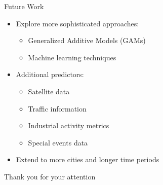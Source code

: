 \documentclass[svgnames, 10pt]{beamer}
\begin{document}
\begin{frame}{Future Work}
\begin{itemize}
    \item Explore more sophisticated approaches:
        \begin{itemize}
            \item Generalized Additive Models (GAMs)
            \item Machine learning techniques
        \end{itemize}
    \item Additional predictors:
        \begin{itemize}
            \item Satellite data
            \item Traffic information
            \item Industrial activity metrics
            \item Special events data
        \end{itemize}
    \item Extend to more cities and longer time periods
\end{itemize}
\end{frame}


\begin{frame}
\begin{center}
\LARGE
\color{mifcolor} Thank you for your attention
\end{center}
\end{frame}
\end{document}
